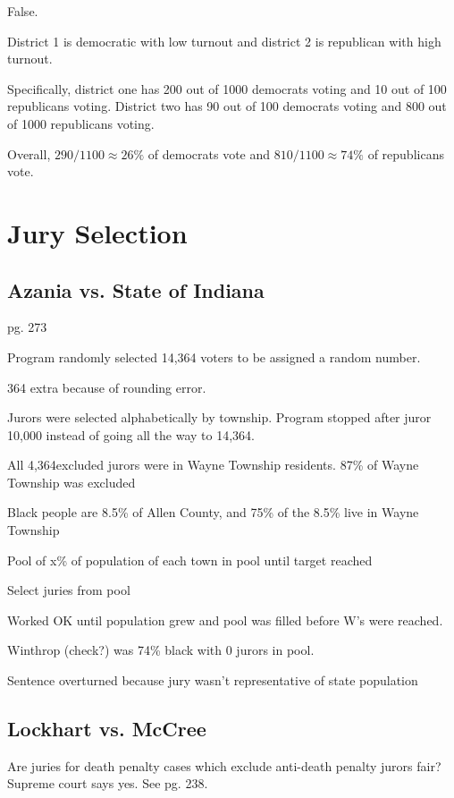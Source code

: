 \documentclass[landscape]{exam}
\begin{document}
  \begin{solution}
    False.  
    
    District 1 is democratic with low turnout and district 2 is republican with
    high turnout.  
    
    Specifically, district one has 200 out of 1000 democrats voting and 10 out
    of 100 republicans voting.  District two has 90 out of 100 democrats voting
    and 800 out of 1000 republicans voting.

    Overall, $290/1100 \approx 26\%$ of democrats vote and 
    $810/1100 \approx 74\%$ of republicans vote.

  \end{solution}
  \section{Jury Selection}

  \subsection{Azania vs. State of Indiana}

  pg. 273

  \begin{itemize*}
    \item Program randomly selected 14,364 voters to be assigned a random
      number.
    \item 364 extra because of rounding error.
    \item Jurors were selected alphabetically by township.  Program stopped
      after juror 10,000 instead of going all the way to 14,364.    
    \item All 4,364excluded jurors were in Wayne Township residents.  87\% of
      Wayne Township was excluded
    \item Black people are 8.5\% of Allen County, and 75\% of the 8.5\% live in
      Wayne Township
  \end{itemize*}

    \begin{itemize*}
    \item Pool of x\% of population of each town in pool until target reached
    \item Select juries from pool
    \item Worked OK until population grew and pool was filled before W's were
      reached.
    \item Winthrop (check?) was 74\% black with 0 jurors in pool.
    \item Sentence overturned because jury wasn't representative of state
      population
  \end{itemize*}

  \subsection{Lockhart vs. McCree}
  Are juries for death penalty cases which exclude anti-death penalty jurors
  fair?  Supreme court says yes. See pg. 238.
\end{document}
